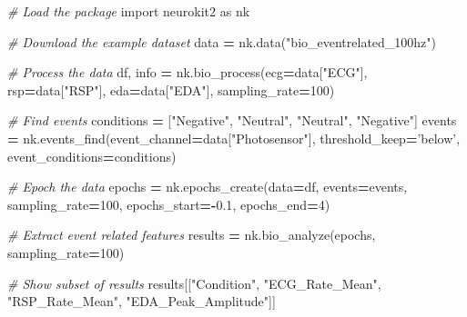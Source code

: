 \documentclass[
  english,
  man,floatsintext]{apa6}
\newenvironment{Shaded}{\begin{snugshade}}{\end{snugshade}}
\newcommand{\CommentTok}[1]{\textcolor[rgb]{0.56,0.35,0.01}{\textit{#1}}}
\newcommand{\DecValTok}[1]{\textcolor[rgb]{0.00,0.00,0.81}{#1}}
\newcommand{\FloatTok}[1]{\textcolor[rgb]{0.00,0.00,0.81}{#1}}
\newcommand{\ImportTok}[1]{#1}
\newcommand{\NormalTok}[1]{#1}
\newcommand{\OperatorTok}[1]{\textcolor[rgb]{0.81,0.36,0.00}{\textbf{#1}}}
\newcommand{\StringTok}[1]{\textcolor[rgb]{0.31,0.60,0.02}{#1}}
\begin{document}
\begin{Shaded}
\begin{Highlighting}[]
\CommentTok{# Load the package}
\ImportTok{import}\NormalTok{ neurokit2 }\ImportTok{as}\NormalTok{ nk}

\CommentTok{# Download the example dataset}
\NormalTok{data }\OperatorTok{=}\NormalTok{ nk.data(}\StringTok{"bio_eventrelated_100hz"}\NormalTok{)}

\CommentTok{# Process the data}
\NormalTok{df, info }\OperatorTok{=}\NormalTok{ nk.bio_process(ecg}\OperatorTok{=}\NormalTok{data[}\StringTok{"ECG"}\NormalTok{],}
\NormalTok{                          rsp}\OperatorTok{=}\NormalTok{data[}\StringTok{"RSP"}\NormalTok{],}
\NormalTok{                          eda}\OperatorTok{=}\NormalTok{data[}\StringTok{"EDA"}\NormalTok{],}
\NormalTok{                          sampling_rate}\OperatorTok{=}\DecValTok{100}\NormalTok{)}

\CommentTok{# Find events}
\NormalTok{conditions }\OperatorTok{=}\NormalTok{ [}\StringTok{"Negative"}\NormalTok{, }\StringTok{"Neutral"}\NormalTok{, }\StringTok{"Neutral"}\NormalTok{, }\StringTok{"Negative"}\NormalTok{]}
\NormalTok{events }\OperatorTok{=}\NormalTok{ nk.events_find(event_channel}\OperatorTok{=}\NormalTok{data[}\StringTok{"Photosensor"}\NormalTok{],}
\NormalTok{                        threshold_keep}\OperatorTok{=}\StringTok{'below'}\NormalTok{,}
\NormalTok{                        event_conditions}\OperatorTok{=}\NormalTok{conditions)}

\CommentTok{# Epoch the data}
\NormalTok{epochs }\OperatorTok{=}\NormalTok{ nk.epochs_create(data}\OperatorTok{=}\NormalTok{df,}
\NormalTok{                          events}\OperatorTok{=}\NormalTok{events,}
\NormalTok{                          sampling_rate}\OperatorTok{=}\DecValTok{100}\NormalTok{,}
\NormalTok{                          epochs_start}\OperatorTok{=-}\FloatTok{0.1}\NormalTok{,}
\NormalTok{                          epochs_end}\OperatorTok{=}\DecValTok{4}\NormalTok{)}

\CommentTok{# Extract event related features}
\NormalTok{results }\OperatorTok{=}\NormalTok{ nk.bio_analyze(epochs, sampling_rate}\OperatorTok{=}\DecValTok{100}\NormalTok{)}

\CommentTok{# Show subset of results}
\NormalTok{results[[}\StringTok{"Condition"}\NormalTok{, }\StringTok{"ECG_Rate_Mean"}\NormalTok{, }\StringTok{"RSP_Rate_Mean"}\NormalTok{, }\StringTok{"EDA_Peak_Amplitude"}\NormalTok{]]}
\end{Highlighting}
\end{Shaded}
\end{document}
